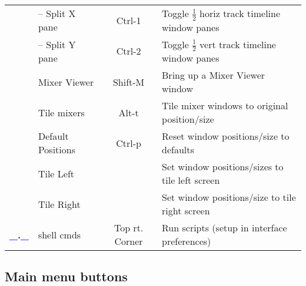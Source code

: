 \begin{center}
\begin{longtable}{>{\bfseries}c l c p{6cm}}
             & -- Split X pane & Ctrl-1 & Toggle $\frac{1}{2}$ horiz track timeline window panes \\             
             & -- Split Y pane & Ctrl-2 & Toggle $\frac{1}{2}$ vert track timeline window panes \\             
             & Mixer Viewer & Shift-M & Bring up a Mixer Viewer window \\             
             & Tile mixers & Alt-t & Tile mixer windows to original position/size \\             
             & Default Positions & Ctrl-p & Reset window positions/size to defaults \\             
             & Tile Left &  & Set window positions/sizes to tile left screen \\             
             & Tile Right &  & Set window positions/size to tile right screen \\
             \midrule
           \textcolor{blue}{\_.\_} & shell cmds & Top rt. Corner & Run scripts (setup in interface preferences) \\
                     
             \bottomrule  
    \end{longtable}
\end{center}

\subsection{Main menu buttons}%
\label{sub:main_menu_buttons}

